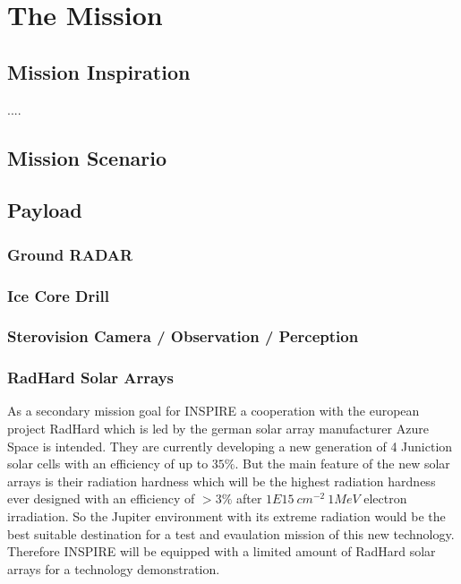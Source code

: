 %
%
%
\chapter{The Mission}
\label{chap:mission}

\section{Mission Inspiration}
\label{sec:inspiration}
....



\section{Mission Scenario}
\label{sec:scenario}


\section{Payload}



\subsection{Ground RADAR}

\subsection{Ice Core Drill}

\subsection{Sterovision Camera / Observation / Perception}

\subsection{RadHard Solar Arrays}
\label{subsec:radhard}
As a secondary mission goal for INSPIRE a cooperation with the european project RadHard which is led by the german solar array manufacturer Azure Space is intended. They are currently developing a new generation of 4 Juniction solar cells with an efficiency of up to $35 \% $. But the main feature of the new solar arrays is their radiation hardness which will be the highest radiation hardness ever designed with an efficiency of $>3 \% $ after $1E15 \ cm^{-2} \ 1MeV$ electron irradiation. So the Jupiter environment with its extreme radiation would be the best suitable destination for a test and evaulation mission of this new technology. Therefore INSPIRE will be equipped with a limited amount of RadHard solar arrays for a technology demonstration.


